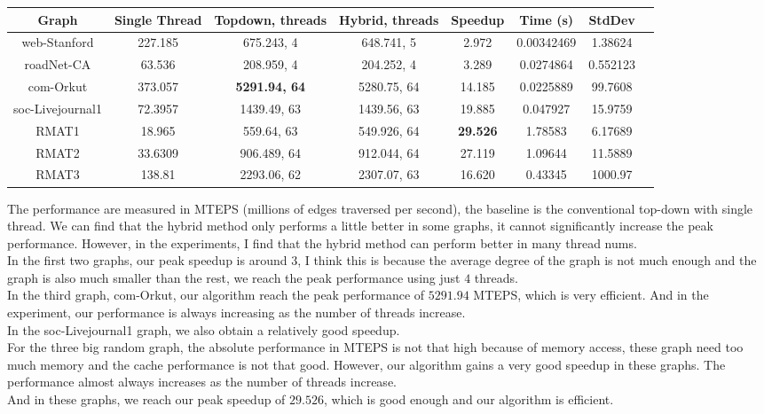 \documentclass[10pt,twocolumn,letterpaper]{article}
\begin{document}
\begin{strip}
\centering
\begin{tabular}{@{}c|ccccccc@{}}
\toprule
Graph            & Single Thread  & Topdown, threads     & Hybrid, threads      & \textbf{Speedup} & Time (s) & StdDev \\ \midrule
web-Stanford     & 227.185 & 675.243, 4  & 648.741, 5  & 2.972 & 0.00342469 & 1.38624    \\
roadNet-CA       & 63.536  & 208.959, 4  & 204.252, 4  & 3.289  & 0.0274864 & 0.552123 \\
com-Orkut        & 373.057 & \textbf{5291.94, 64} & 5280.75, 64 & 14.185 & 0.0225889 & 99.7608 \\
soc-Livejournal1 & 72.3957 & 1439.49, 63 & 1439.56, 63 & 19.885 & 0.047927 & 15.9759 \\
RMAT1            & 18.965 & 559.64, 63  & 549.926, 64 & \textbf{29.526} & 1.78583 & 6.17689  \\
RMAT2            & 33.6309 &    906.489, 64         &   912.044, 64          &   27.119 & 1.09644 & 11.5889      \\
RMAT3            &    138.81     & 2293.06, 62            & 2307.07, 63            &16.620 & 0.43345 & 1000.97         \\ \bottomrule
\end{tabular}

\end{strip}

The performance are measured in MTEPS (millions of edges traversed per second), the baseline is the conventional top-down with single thread. We can find that the hybrid method only performs a little better in some graphs, it cannot significantly increase the peak performance. However, in the experiments, I find that the hybrid method can perform better in many thread nums.\\
In the first two graphs, our peak speedup is around $3$, I think this is because the average degree of the graph is not much enough and the graph is also much smaller than the rest, we reach the peak performance using just $4$ threads.\\
In the third graph, com-Orkut, our algorithm reach the peak performance of $5291.94$ MTEPS, which is very efficient. And in the experiment, our performance is always increasing as the number of threads increase.\\
In the soc-Livejournal1 graph, we also obtain a relatively good speedup.\\
For the three big random graph, the absolute performance in MTEPS is not that high because of memory access, these graph need too much memory and the cache performance is not that good. However, our algorithm gains a very good speedup in these graphs. The performance almost always increases as the number of threads increase.\\
And in these graphs, we reach our peak speedup of $29.526$, which is good enough and our algorithm is efficient.
\end{document}
